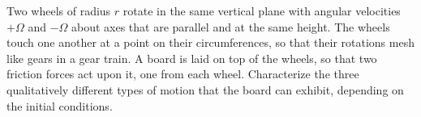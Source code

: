 Two wheels of radius $r$ rotate in the same vertical plane with
angular velocities $+\Omega$ and $-\Omega$ about axes that are
parallel and at the same height. The wheels touch one another at a point on
their circumferences, so that their rotations mesh like gears in a gear train.
A board is laid on top of the wheels, so that two friction forces act upon it,
one from each wheel. Characterize the three  qualitatively different types
of motion that the board can exhibit, depending on the initial conditions.
